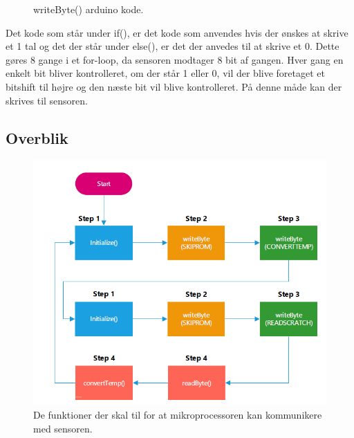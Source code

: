 \begin{figure}[h!]
  \centering
  \caption{writeByte() arduino kode.}
  \label{write_byte}
\end{figure}
Det kode som står under if(), er det kode som anvendes hvis der ønskes at skrive et 1 tal og det der står under else(), er det der anvedes til at skrive et 0. Dette gøres 8 gange i et for-loop, da sensoren modtager 8 bit af gangen. Hver gang en enkelt bit bliver kontrolleret, om der står 1 eller 0, vil der blive foretaget et bitshift til højre og den næste bit vil blive kontrolleret. På denne måde kan der skrives til sensoren.


\subsection{Overblik}

\begin{figure}[h!]
  \centering
  \includegraphics[width=1\textwidth]{figures/sensor_communication.png}
  \caption{De funktioner der skal til for at mikroprocessoren kan kommunikere med sensoren.}
  \label{sensor_total}
\end{figure}